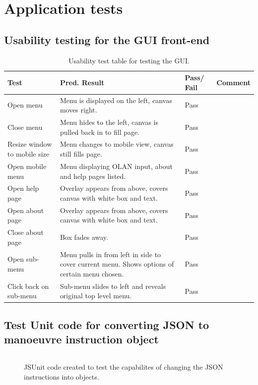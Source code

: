 \chapter{Application tests}

\section{Usability testing for the GUI front-end}
\label{test:canvas}
\begin{table}[h]
\begin{tabular}{|p{4.5cm}|p{4.5cm}|p{2cm}|p{2.5cm}|}
\hline
\textbf{Test} & \textbf{Pred. Result} & \textbf{Pass/ Fail} & \textbf{Comment}                        \\ \hline
Open menu    &   Menu is displayed on the left, canvas moves right. &  Pass          &    \\ \hline
Close menu    &   Menu hides to the left, canvas is pulled back in to fill page. &   Pass         &     \\ \hline
Resize window to mobile size    & Menu changes to mobile view, canvas still fills page.   & Pass           &     \\ \hline
Open mobile menu    & Menu displaying OLAN input, about and help pages listed.   &     Pass       &     \\ \hline
Open help page    &  Overlay appears from above, covers canvas with white box and text.  &       Pass     &     \\ \hline
Open about page    &  Overlay appears from above, covers canvas with white box and text.  &      Pass      &     \\ \hline
Close about page    &  Box fades away.  &      Pass      &     \\ \hline
Open sub-menu    &  Menu pulls in from left in side to cover current menu. Shows options of certain menu chosen.  &    Pass        &     \\ \hline
Click back on sub-menu    &  Sub-menu slides to left and reveals original top level menu.  &    Pass        &     \\ \hline
\end{tabular}
\caption{Usability test table for testing the GUI.}
\end{table}

\section{Test Unit code for converting JSON to manoeuvre instruction object}
\label{test:jsonmvoes}
\begin{figure}[h!]
\caption{JSUnit code created to test the capabilites of changing the JSON instructions into objects.}
\begin{lstlisting}
\end{lstlisting}
\end{figure}

